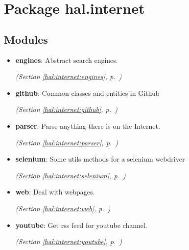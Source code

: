 %
%
%


\section{Package hal.internet}

    \label{hal:internet}


\subsection{Modules}

\begin{itemize}
\setlength{\parskip}{0ex}
\item \textbf{engines}: Abstract search engines. 


  \textit{(Section \ref{hal:internet:engines}, p.~\pageref{hal:internet:engines})}

\item \textbf{github}: Common classes and entities in Github 


  \textit{(Section \ref{hal:internet:github}, p.~\pageref{hal:internet:github})}

\item \textbf{parser}: Parse anything there is on the Internet. 


  \textit{(Section \ref{hal:internet:parser}, p.~\pageref{hal:internet:parser})}

\item \textbf{selenium}: Some utils methods for a selenium webdriver 


  \textit{(Section \ref{hal:internet:selenium}, p.~\pageref{hal:internet:selenium})}

\item \textbf{web}: Deal with webpages. 


  \textit{(Section \ref{hal:internet:web}, p.~\pageref{hal:internet:web})}

\item \textbf{youtube}: Get rss feed for youtube channel. 


  \textit{(Section \ref{hal:internet:youtube}, p.~\pageref{hal:internet:youtube})}

\end{itemize}


